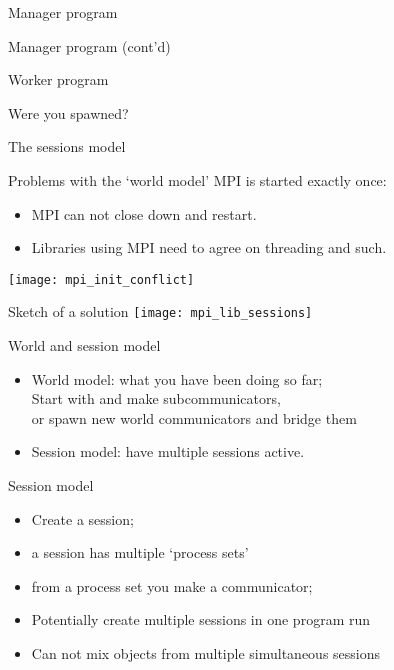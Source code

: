 \begin{numberedframe}{Manager program}
  \footnotesize
\end{numberedframe}

\begin{numberedframe}{Manager program (cont'd)}
  \footnotesize
\end{numberedframe}

\begin{numberedframe}{Worker program}
\end{numberedframe}

\begin{numberedframe}{Were you spawned?}
\end{numberedframe}

 {The sessions model}

\begin{numberedframe}{Problems with the `world model'}
  MPI is started exactly once:
  \begin{itemize}
  \item MPI can not close down and restart.
  \item Libraries using MPI need to agree on threading and such.
  \end{itemize}
  \texttt{[image: mpi\_init\_conflict]}
\end{numberedframe}

\begin{numberedframe}{Sketch of a solution}
  \texttt{[image: mpi\_lib\_sessions]}  
\end{numberedframe}

\begin{numberedframe}{World and session model}
  \begin{itemize}
  \item World model: what you have been doing so far;\\
    Start with  and
    make subcommunicators, \\
    or spawn new world communicators and bridge them
  \item Session model: have multiple sessions active.
  \end{itemize}
\end{numberedframe}

\begin{numberedframe}{Session model}
  \begin{itemize}
  \item Create a session;
  \item a session has multiple `process sets'
  \item from a process set you make a communicator;
  \item Potentially create multiple sessions in one program run
  \item Can not mix objects from multiple simultaneous sessions
  \end{itemize}
\end{numberedframe}

